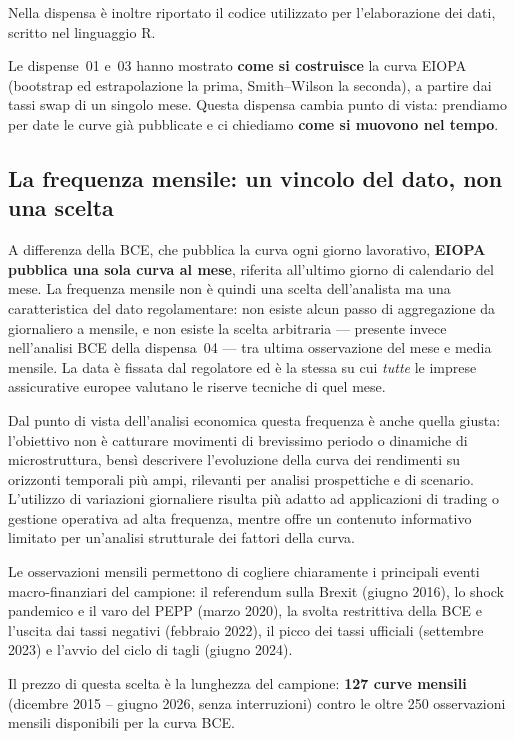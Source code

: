 \documentclass[11pt,a4paper]{article}
\theoremstyle{plain}
\theoremstyle{definition}
\theoremstyle{remark}
\begin{document}
Nella dispensa \`e inoltre riportato il codice utilizzato per l'elaborazione dei
dati, scritto nel linguaggio R.

\medskip
Le dispense~01 e~03 hanno mostrato \textbf{come si costruisce} la curva EIOPA
(bootstrap ed estrapolazione la prima, Smith--Wilson la seconda), a partire dai
tassi swap di un singolo mese. Questa dispensa cambia punto di vista: prendiamo
per date le curve gi\`a pubblicate e ci chiediamo \textbf{come si muovono nel
tempo}.

\subsection{La frequenza mensile: un vincolo del dato, non una scelta}
\label{sec:motivazione-mensile}

A differenza della BCE, che pubblica la curva ogni giorno lavorativo,
\textbf{EIOPA pubblica una sola curva al mese}, riferita all'ultimo giorno di
calendario del mese. La frequenza mensile non \`e quindi una scelta
dell'analista ma una caratteristica del dato regolamentare: non esiste alcun
passo di aggregazione da giornaliero a mensile, e non esiste la scelta
arbitraria --- presente invece nell'analisi BCE della dispensa~04 --- tra
ultima osservazione del mese e media mensile. La data \`e fissata dal
regolatore ed \`e la stessa su cui \emph{tutte} le imprese assicurative europee
valutano le riserve tecniche di quel mese.

Dal punto di vista dell'analisi economica questa frequenza \`e anche quella
giusta: l'obiettivo non \`e catturare movimenti di brevissimo periodo o
dinamiche di microstruttura, bens\`i descrivere l'evoluzione della curva dei
rendimenti su orizzonti temporali pi\`u ampi, rilevanti per analisi prospettiche
e di scenario. L'utilizzo di variazioni giornaliere risulta pi\`u adatto ad
applicazioni di trading o gestione operativa ad alta frequenza, mentre offre un
contenuto informativo limitato per un'analisi strutturale dei fattori della curva.

Le osservazioni mensili permettono di cogliere chiaramente i principali eventi
macro-finanziari del campione: il referendum sulla Brexit (giugno 2016), lo
shock pandemico e il varo del PEPP (marzo 2020), la svolta restrittiva della BCE
e l'uscita dai tassi negativi (febbraio 2022), il picco dei tassi ufficiali
(settembre 2023) e l'avvio del ciclo di tagli (giugno 2024).

Il prezzo di questa scelta \`e la lunghezza del campione: \textbf{127 curve
mensili} (dicembre 2015 -- giugno 2026, senza interruzioni) contro le oltre 250
osservazioni mensili disponibili per la curva BCE.
\end{document}
